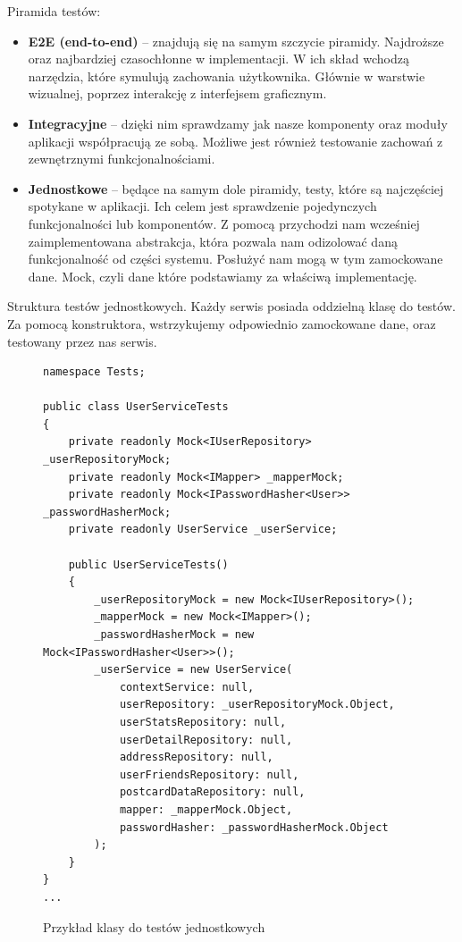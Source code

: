 \documentclass[a4paper,twoside,12pt]{book}
\begin{document}
Piramida testów:
\begin{itemize}
    \item \textbf{E2E (end-to-end)} -- znajdują się na samym szczycie piramidy. Najdroższe oraz najbardziej czasochłonne w implementacji. W ich skład wchodzą narzędzia, które symulują zachowania użytkownika. Głównie w warstwie wizualnej, poprzez interakcję z interfejsem graficznym.
    \item \textbf{Integracyjne} -- dzięki nim sprawdzamy jak nasze komponenty oraz moduły aplikacji współpracują ze sobą. Możliwe jest również testowanie zachowań z zewnętrznymi funkcjonalnościami.
    \item \textbf{Jednostkowe} -- będące na samym dole piramidy, testy, które są najczęściej spotykane w aplikacji. Ich celem jest sprawdzenie pojedynczych funkcjonalności lub komponentów. Z pomocą przychodzi nam wcześniej zaimplementowana abstrakcja, która pozwala nam odizolować daną funkcjonalność od części systemu. Posłużyć nam mogą w tym zamockowane dane. Mock, czyli dane które podstawiamy za właściwą implementację.
\end{itemize}

Struktura testów jednostkowych. 
Każdy serwis posiada oddzielną klasę do testów. 
Za pomocą konstruktora, wstrzykujemy odpowiednio zamockowane dane, oraz testowany przez nas serwis.

    \begin{figure}[H]
        \begin{lstlisting}
namespace Tests;

public class UserServiceTests
{
    private readonly Mock<IUserRepository> _userRepositoryMock;
    private readonly Mock<IMapper> _mapperMock;
    private readonly Mock<IPasswordHasher<User>> _passwordHasherMock;
    private readonly UserService _userService;

    public UserServiceTests()
    {
        _userRepositoryMock = new Mock<IUserRepository>();
        _mapperMock = new Mock<IMapper>();
        _passwordHasherMock = new Mock<IPasswordHasher<User>>();
        _userService = new UserService(
            contextService: null,
            userRepository: _userRepositoryMock.Object,
            userStatsRepository: null,
            userDetailRepository: null,
            addressRepository: null,
            userFriendsRepository: null,
            postcardDataRepository: null,
            mapper: _mapperMock.Object,
            passwordHasher: _passwordHasherMock.Object
        );
    }
}
...
        \end{lstlisting}
    \caption{Przykład klasy do testów jednostkowych}
    \label{fig:pseudokod:listings}
    \end{figure}
\end{document}
